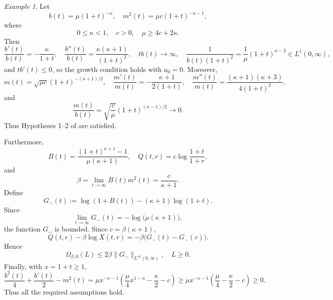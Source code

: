 \documentclass[11pt,reqno]{amsart}
\theoremstyle{definition}
\theoremstyle{remark}
\newtheorem{example}{Example}
\begin{document}
	\begin{example}
		Let
		$$
		b(t)=\mu(1+t)^{-\kappa},
		\quad
		m^2(t)=\mu c(1+t)^{-\kappa-1},
		$$
		where
		$$
		0 \leq \kappa<1,
		\quad
		c>0,
		\quad
		\mu\geq4c+2\kappa.
		$$
		Then
		$$
		\frac{b'(t)}{b(t)}=-\frac{\kappa}{1+t}, \quad \frac{b''(t)}{b(t)}=\frac{\kappa(\kappa+1)}{(1+t)^2}, \quad
		tb(t)\longrightarrow\infty, \quad
		\frac{1}{b(t)(1+t)^2}
		=\frac{1}{\mu}(1+t)^{\kappa-2}\in L^1(0,\infty),
		$$
		and $tb'(t)\leq0$, so the growth condition holds with $a_0=0$.
		Moreover,
		$$
		m(t)=\sqrt{\mu c}(1+t)^{-(\kappa+1)/2}, \quad
		\frac{m'(t)}{m(t)}=-\frac{\kappa+1}{2(1+t)},
		\quad
		\frac{m''(t)}{m(t)}
		=\frac{(\kappa+1)(\kappa+3)}{4(1+t)^2},
		$$
		and
		$$
		\frac{m(t)}{b(t)}
		=\sqrt{\frac{c}{\mu}}(1+t)^{(\kappa-1)/2}
		\longrightarrow0.
		$$
		Thus Hypotheses 1--2 of \cite{DGR2019} are satisfied.
		
		Furthermore,
		$$
		B(t)=\frac{(1+t)^{\kappa+1}-1}{\mu(\kappa+1)},
		\quad
		Q(t,r)=c\log\frac{1+t}{1+r},
		$$
		and
		$$
		\beta=\lim_{t\to\infty}B(t)m^2(t)
		=\frac{c}{\kappa+1}.
		$$
		Define
		$$
		G_-(t):=\log(1+B(t))-(\kappa+1)\log(1+t).
		$$
		Since
		$$
		\lim_{t\to\infty}G_-(t)
		=-\log\bigl(\mu(\kappa+1)\bigr),
		$$
		the function $G_-$ is bounded. Since $c=\beta(\kappa+1)$,
		$$
		Q(t,r)-\beta\log X(t,r)
		=-\beta\bigl(G_-(t)-G_-(r)\bigr).
		$$
		Hence
		$$
		\Omega_{\beta,0}(L)
		\leq2\beta\|G_-\|_{L^\infty(0,\infty)},
		\quad L\geq0.
		$$
		Finally, with $x=1+t\geq1$,
		$$
		\frac{b^2(t)}4+\frac{b'(t)}2-m^2(t)=\mu x^{-\kappa-1}
		\left(\frac{\mu}{4}x^{1-\kappa}-\frac{\kappa}{2}-c\right)\geq\mu x^{-\kappa-1}
		\left(\frac{\mu}{4}-\frac{\kappa}{2}-c\right)\geq0.
		$$
		Thus all the required assumptions hold.
	\end{example}
	
\end{document}
